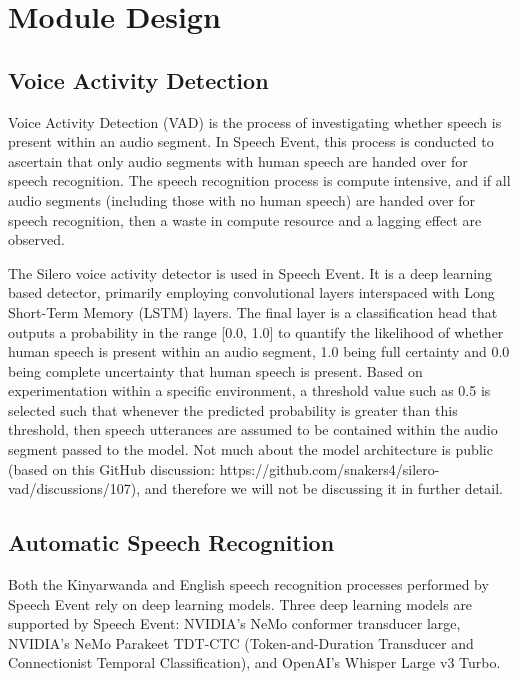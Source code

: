\documentclass{CSSRforAfrica}
\begin{document}
\newpage
\section{Module Design}
\subsection{Voice Activity Detection}
Voice Activity Detection (VAD) is the process of investigating whether speech is present within an audio segment. In Speech Event, this process is conducted to ascertain that only audio segments with human speech are handed over for speech recognition. The speech recognition process is compute intensive, and if all audio segments (including those with no human speech) are handed over for speech recognition, then a waste in compute resource and a lagging effect are observed.

The Silero voice activity detector \cite{Silero_VAD} is used in Speech Event. It is a deep learning based detector, primarily employing convolutional layers interspaced with Long Short-Term Memory (LSTM) layers. The final layer is a classification head that outputs a probability in the range [0.0, 1.0] to quantify the likelihood of whether human speech is present within an audio segment, 1.0 being full certainty and 0.0 being complete uncertainty that human speech is present. Based on experimentation within a specific environment, a threshold value such as 0.5 is selected such that whenever the predicted probability is greater than this threshold, then speech utterances are assumed to be contained within the audio segment passed to the model. Not much about the model architecture is public (based on this GitHub discussion: https://github.com/snakers4/silero-vad/discussions/107), and therefore we will not be discussing it in further detail.

\subsection{Automatic Speech Recognition}
Both the Kinyarwanda and English speech recognition processes performed by Speech Event rely on deep learning models. Three deep learning models are supported by Speech Event: NVIDIA's NeMo conformer transducer large, NVIDIA's NeMo Parakeet TDT-CTC (Token-and-Duration Transducer and Connectionist Temporal Classification), and OpenAI's Whisper Large v3 Turbo.
\end{document}
